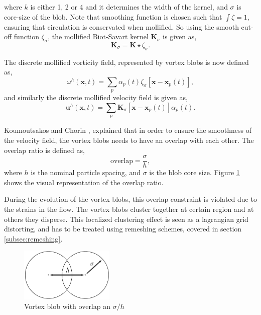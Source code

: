 where $k$ is either 1, 2 or 4 and it determines the width of the kernel, and $\sigma$ is core-size of the blob. Note that smoothing function is chosen such that $\int \zeta = 1$, ensuring that circulation is conservated when mollified. So using the smooth cut-off function $\zeta_{\sigma}$, the mollified Biot-Savart kernel $\mathbf{K}_{\sigma}$ is given as,	 
	\begin{equation}
	\mathbf{K}_{\sigma} = \mathbf{K} \star \zeta_{\sigma}.
	\end{equation}

The discrete mollified vorticity field, represented by vortex blobs is now defined as,
	\begin{equation}
	\omega^h\left(\mathbf{x},t\right) = \sum_p \alpha_p\left(t\right)\zeta_{\sigma}\left[\mathbf{x}-\mathbf{x}_p\left(t\right)\right],
	\label{eq:mollifiedVorticityField}
	\end{equation}
and similarly the discrete mollified velocity field is given as,
	\begin{equation}
	\mathbf{u}^h\left(\mathbf{x},t\right) = \sum_p \mathbf{K}_{\sigma}\left[\mathbf{x}-\mathbf{x}_p\left(t\right)\right]\alpha_p\left(t\right).
	\end{equation}

Koumoutsakos and Chorin \cite{Cottet2000a}, explained that in order to ensure the smoothness of the velocity field, the vortex blobs needs to have an overlap with each other. The overlap ratio is defined as,
	\begin{equation}
	\mathrm{overlap} = \frac{\sigma}{h},
	\label{eq:overlapRatio}
	\end{equation}
where $h$ is the nominal particle spacing, and $\sigma$ is the blob core size. Figure \ref{fig:blobOverlap} shows the visual representation of the overlap ratio.

During the evolution of the vortex blobs, this overlap constraint is violated due to the strains in the flow. The vortex blobs cluster together at certain region and at others they disperse. This localized clustering effect is seen as a lagrangian grid distorting, and has to be treated using remeshing schemes, covered in section \ref{subsec:remeshing}.

	\begin{figure}[!t]
	\centering
	\includegraphics[width=0.4\textwidth]{figures/lagrangian/blobOverlap.pdf}
	\caption{Vortex blob with overlap an $\sigma/h$}
	\label{fig:blobOverlap}
	\end{figure}

